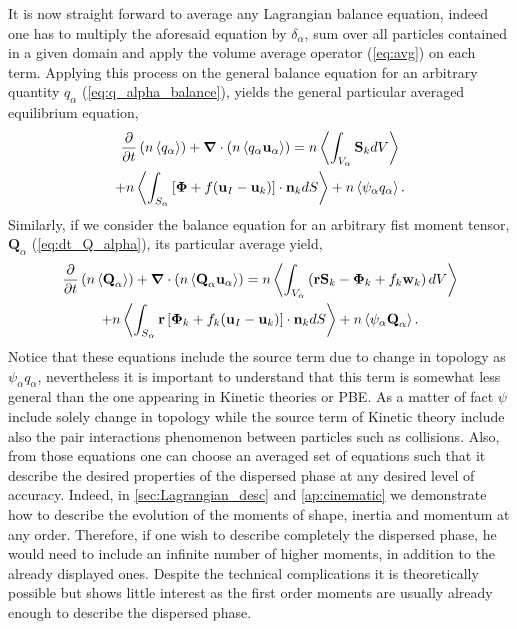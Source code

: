 It is now straight forward to average any Lagrangian balance equation, indeed one has to multiply the aforesaid equation by $\delta_\alpha$, sum over all particles contained in a given domain and apply the volume average operator (\ref{eq:avg}) on each term. 
Applying this process on the general balance equation for an arbitrary quantity $q_\alpha$ (\ref{eq:q_alpha_balance}), yields the general particular averaged equilibrium equation,
\begin{multline}
    \frac{\partial}{\partial t}   \left(n \left<q_\alpha\right>\right)
    + \bm{\nabla} \cdot \left(n \left<q_\alpha \textbf{u}_\alpha\right>\right) 
    = n \left<\int_{V_\alpha} \textbf{S}_k dV\right>\\
    + n \left<\int_{S_\alpha} \left[\bm{\Phi} + f (\textbf{u}_I-\textbf{u}_k) \right] \cdot \textbf{n}_k d S\right>
    + n \left<\psi_\alpha q_\alpha\right>
    .\label{eq:q_avg_p_global}
\end{multline}
Similarly, if we consider the balance equation for an arbitrary fist moment tensor, $\textbf{Q}_\alpha$ (\ref{eq:dt_Q_alpha}), its particular average yield,  
\begin{multline}
    \frac{\partial}{\partial t}   \left(n \left<\textbf{Q}_\alpha\right>\right)
    + \bm{\nabla} \cdot \left(n \left<\textbf{Q}_\alpha \textbf{u}_\alpha\right>\right) 
    = n \left<\int_{V_\alpha} \left( 
        \textbf{r} \textbf{S}_k 
        - \bm{\Phi}_k
        + f_k  \textbf{w}_k 
    \right) dV\right>\\
    + n \left<\int_{S_\alpha} \textbf{r} \left[
        \bm{\Phi}_k
        + f_k (\textbf{u}_I-\textbf{u}_k)
    \right]\cdot \textbf{n}_k  dS\right>
    + n \left<\psi_\alpha \textbf{Q}_\alpha\right>
    .\label{eq:dt_avg_Q_alpha}
\end{multline}
Notice that these equations include the source term due to change in topology as $\psi_\alpha q_\alpha$, nevertheless it is important to understand that this term is somewhat less general than the one appearing in Kinetic theories or PBE. 
As a matter of fact $\psi$ include solely change in topology while the source term of Kinetic theory include also the pair interactions phenomenon between particles such as collisions. 
Also, from those equations one can choose an averaged set of equations such that it describe the desired properties of the dispersed phase at any desired level of accuracy.
Indeed, in \ref{sec:Lagrangian_desc} and \ref{ap:cinematic} we demonstrate how to describe the evolution of the moments of shape, inertia and momentum at any order.
Therefore, if one wish to describe completely the dispersed phase, he would need to include an infinite number of higher moments, in addition to the already displayed ones. 
Despite the technical complications it is theoretically possible but shows little interest as the first order moments are usually already enough to describe the dispersed phase.  

